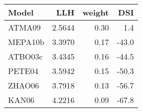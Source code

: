 \begin{tabular}{lrrr}
\toprule
   Model &     LLH &  weight &   DSI \\
\midrule
  ATMA09 &  2.5644 &    0.30 &   1.4 \\
 MEPA10b &  3.3970 &    0.17 & -43.0 \\
 ATBO03c &  3.4345 &    0.16 & -44.5 \\
  PETE04 &  3.5942 &    0.15 & -50.3 \\
  ZHAO06 &  3.7918 &    0.13 & -56.7 \\
   KAN06 &  4.2216 &    0.09 & -67.8 \\
\bottomrule
\end{tabular}
